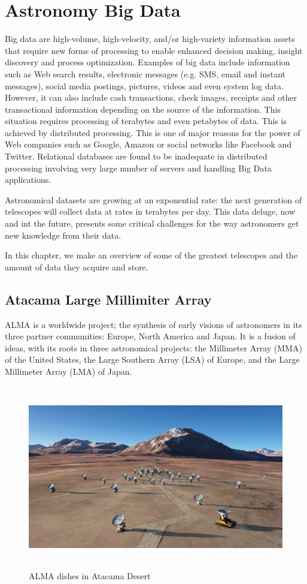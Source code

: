 \chapter{Astronomy Big Data}\label{theproblem}


Big data are high-volume, high-velocity, and/or high-variety information assets that require new forms of processing to enable enhanced decision making, insight discovery and process optimization. Examples of big data include information such as Web search results, electronic messages (e.g. SMS, email and instant messages), social media postings, pictures, videos and even system log data. However, it can also include cash transactions, check images, receipts and other transactional information depending on the source of the information. This situation requires processing of terabytes and even petabytes of data. This is achieved by distributed processing. This is one of major reasons for the power of Web companies such as
Google, Amazon or social networks like Facebook and Twitter. Relational databases are found to be inadequate in distributed processing involving very large number of servers and handling Big Data applications.

Astronomical datasets are growing at an exponential rate: the next generation of telescopes will collect data at rates in terabytes per day. This data deluge, now and int the future, presents some critical challenges for the way astronomers get new knowledge from their data.

In this chapter, we make an overview of some of the greatest telescopes and the amount of data they acquire and store.


\section{Atacama Large Millimiter Array}

ALMA is a worldwide project; the synthesis of early visions of astronomers in its three partner communities: Europe, North America and Japan. It is a fusion of ideas, with its roots in three astronomical projects: the Millimeter Array (MMA) of the United States, the Large Southern Array (LSA) of Europe, and the Large Millimeter Array (LMA) of Japan.

 \begin{figure}[tb]
 \centering
 \includegraphics[height=8cm]{images/alma.jpg}
 \caption{ALMA dishes in Atacama Desert}
 \end{figure}


